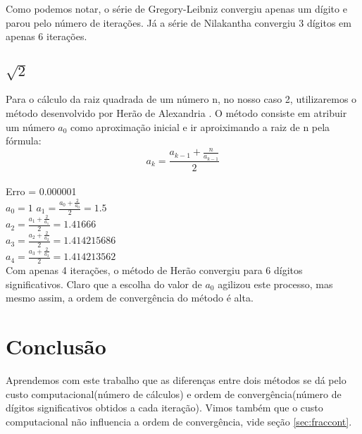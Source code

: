 \documentclass[11pt]{article}
\begin{document}
Como podemos notar, o série de Gregory-Leibniz convergiu apenas um dígito e parou pelo número de iterações.
Já a série de Nilakantha convergiu 3 dígitos em apenas 6 iterações.
\subsection{$\sqrt{2}$}
Para o cálculo da raiz quadrada de um número n, no nosso caso 2, utilizaremos o método desenvolvido por Herão de Alexandria \cite{herao}.
O método consiste em atribuir um número $a_0$ como aproximação inicial e ir aproiximando a raiz de n pela fórmula:
$$a_k = \frac{a_{k-1} + \frac{n}{a_{k-1}}}{2}$$ \\
Erro = 0.000001\\
$a_0 = 1$
$a_1 = \frac{a_0 + \frac{2}{a_0}}{2} = 1.5$\\
$a_2 = \frac{a_1 + \frac{2}{a_1}}{2} = 1.41666$\\
$a_3 = \frac{a_2 + \frac{2}{a_2}}{2} = 1.414215686$\\
$a_4 = \frac{a_3 + \frac{2}{a_3}}{2} = 1.414213562$\\

Com apenas 4 iterações, o método de Herão convergiu para 6 dígitos significativos. Claro que a escolha do valor de $a_0$ agilizou este processo, mas mesmo assim, a ordem de convergência do método é alta.

\section{Conclusão}
Aprendemos com este trabalho que as diferenças entre dois métodos se dá pelo custo computacional(número de cálculos) e ordem de convergência(número de dígitos significativos obtidos a cada iteração). Vimos também que o custo computacional não influencia a ordem de convergência, vide seção \ref{sec:fraccont}.


\end{document}
